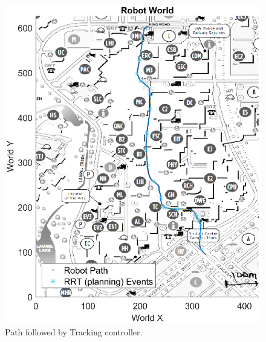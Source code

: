 \documentclass[oneside, 11pt]{book}
\begin{document}
\begin{figure}[!htbp]
    \centering
    \includegraphics{images/campus_tracking.eps}
    \caption{Path followed by Tracking controller.}
    \label{fig:mock_campus_tracking}
\end{figure}
\end{document}
